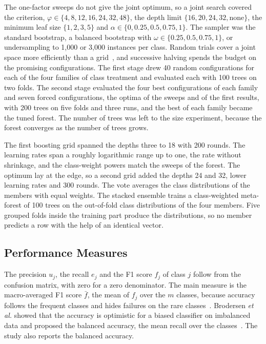 \documentclass[10pt,conference]{IEEEtran}
\begin{document}
The one-factor sweeps do not give the joint optimum, so a joint search covered the criterion, $\varphi \in \{4, 8, 12, 16, 24, 32, 48\}$, the depth limit $\{16, 20, 24, 32, \text{none}\}$, the minimum leaf size $\{1, 2, 3, 5\}$ and $\alpha \in \{0, 0.25, 0.5, 0.75, 1\}$. The sampler was the standard bootstrap, a balanced bootstrap with $\omega \in \{0.25, 0.5, 0.75, 1\}$, or undersampling to 1,000 or 3,000 instances per class. Random trials cover a joint space more efficiently than a grid~\cite{bergstra2012}, and successive halving spends the budget on the promising configurations. The first stage drew 40 random configurations for each of the four families of class treatment and evaluated each with 100 trees on two folds. The second stage evaluated the four best configurations of each family and seven forced configurations, the optima of the sweeps and of the first results, with 200 trees on five folds and three runs, and the best of each family became the tuned forest. The number of trees was left to the size experiment, because the forest converges as the number of trees grows.

The first boosting grid spanned the depths three to 18 with 200 rounds. The learning rates span a roughly logarithmic range up to one, the rate without shrinkage, and the class-weight powers match the sweeps of the forest. The optimum lay at the edge, so a second grid added the depths 24 and 32, lower learning rates and 300 rounds. The vote averages the class distributions of the members with equal weights. The stacked ensemble trains a class-weighted meta-forest of 100 trees on the out-of-fold class distributions of the four members. Five grouped folds inside the training part produce the distributions, so no member predicts a row with the help of an identical vector.

\subsection{Performance Measures}
\label{sec:procedure-measures}

The precision $u_j$, the recall $e_j$ and the F1 score $f_j$ of class $j$ follow from the confusion matrix, with zero for a zero denominator. The main measure is the macro-averaged F1 score $\bar{f}$, the mean of $f_j$ over the $m$ classes, because accuracy follows the frequent classes and hides failures on the rare classes~\cite{vanzyl2025}. Brodersen \textit{et al.} showed that the accuracy is optimistic for a biased classifier on imbalanced data and proposed the balanced accuracy, the mean recall over the classes~\cite{brodersen2010}. The study also reports the balanced accuracy.
\end{document}
